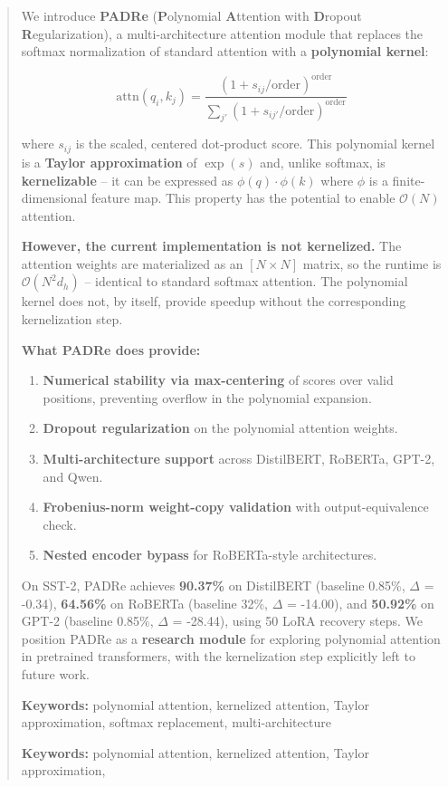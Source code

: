 \documentclass{article}
\begin{document}
\maketitle

\begin{abstract}
We introduce \textbf{PADRe} (\textbf{P}olynomial \textbf{A}ttention with \textbf{D}ropout \textbf{R}egularization), 
a multi-architecture attention module that replaces the softmax normalization 
of standard attention with a \textbf{polynomial kernel}:

\[
\text{attn}(q_i, k_j) = \frac{(1 + s_{ij}/\text{order})^\text{order}}{\sum_{j'} (1 + s_{ij'}/\text{order})^\text{order}}
\]

where $s_{ij}$ is the scaled, centered dot-product score. This polynomial 
kernel is a \textbf{Taylor approximation} of $\exp(s)$ and, unlike softmax, is 
\textbf{kernelizable} -- it can be expressed as $\phi(q) \cdot \phi(k)$ where $\phi$ 
is a finite-dimensional feature map. This property has the potential to enable 
$\mathcal{O}(N)$ attention.

\textbf{However, the current implementation is not kernelized.} The attention 
weights are materialized as an $[N \times N]$ matrix, so the runtime is 
$\mathcal{O}(N^2 d_h)$ -- identical to standard softmax attention. The 
polynomial kernel does not, by itself, provide speedup without the 
corresponding kernelization step.

\textbf{What PADRe does provide:}

\begin{enumerate}
\item \textbf{Numerical stability via max-centering} of scores over valid positions,
  preventing overflow in the polynomial expansion.
\item \textbf{Dropout regularization} on the polynomial attention weights.
\item \textbf{Multi-architecture support} across DistilBERT, RoBERTa, GPT-2, and Qwen.
\item \textbf{Frobenius-norm weight-copy validation} with output-equivalence check.
\item \textbf{Nested encoder bypass} for RoBERTa-style architectures.

\end{enumerate}
On SST-2, PADRe achieves \textbf{90.37\%} on DistilBERT (baseline 0.85\%, 
$\Delta$ = -0.34), \textbf{64.56\%} on RoBERTa (baseline 32\%, 
$\Delta$ = -14.00), and \textbf{50.92\%} on GPT-2 (baseline 0.85\%, 
$\Delta$ = -28.44), using 50 LoRA recovery steps. We 
position PADRe as a \textbf{research module} for exploring polynomial attention 
in pretrained transformers, with the kernelization step explicitly left to 
future work.

\textbf{Keywords:} polynomial attention, kernelized attention, Taylor approximation, 
softmax replacement, multi-architecture



\vspace{0.5em}
\noindent\textbf{Keywords:} polynomial attention, kernelized attention, Taylor approximation,
\end{abstract}
\end{document}
